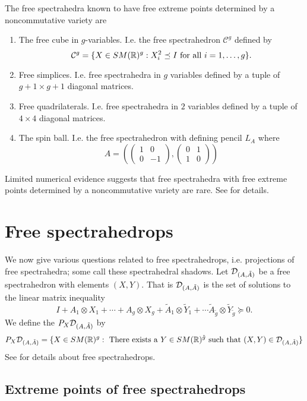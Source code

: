 The free spectrahedra known to have free extreme points determined by a noncommutative variety are
\begin{enumerate}
\item The free cube in $g$-variables. I.e. the free spectrahedron $\mathcal{C}^g$ defined by
\[
\mathcal{C}^g = \{X \in SM(\mathbb{R})^g : X_i^2 \preceq I \ \mathrm{for \ all} \ i = 1,\dots, g\}.
\]
\item Free simplices. I.e. free spectrahedra in $g$ variables defined by a tuple of $g+1 \times g+1$ diagonal matrices.
\item Free quadrilaterals. I.e. free spectrahedra in $2$ variables defined by a tuple of $4 \times 4$ diagonal matrices.
\item The spin ball. I.e. the free spectrahedron with defining pencil $L_A$ where 
\[
A = \left(\begin{pmatrix}
1 & 0 \\ 
0 & -1
\end{pmatrix},
\begin{pmatrix}
0 & 1 \\ 
1 & 0
\end{pmatrix}
\right)
\]
\end{enumerate}

Limited numerical evidence suggests that free spectrahedra with free extreme points determined by a noncommutative variety are rare. See 
\cite{E+} for details.



\section{Free spectrahedrops}

We now give various questions related to free spectrahedrops, i.e. projections of free spectrahedra; some call these spectrahedral shadows. 
Let $\mathcal{D}_{(A,\tilde{A})}$ be a free spectrahedron with elements $(X,Y)$. That is $\mathcal{D}_{(A,\tilde{A})}$ is the set of solutions to the linear 
matrix inequality
\[
I+A_1 \otimes X_1 + \cdots + A_g \otimes X_g + \tilde{A}_1 \otimes \tilde{Y}_1 + \cdots \tilde{A}_{\tilde{g}} \otimes \tilde{Y}_{\tilde{g}} 
\succeq 0. 
\]
We define the  $P_X \mathcal{D}_{(A,\tilde{A})}$ by
\[
P_X \cD_{(A,\tilde{A})} = \{ X \in SM(\R)^g : \mathrm{\ There \ exists\ a \ } Y \in SM(\R)^{\tilde{g}} \ \mathrm{such\ that\ } (X,Y) \in 
\cD_{(A,\tilde{A})} \}
\]
See \cite{HKMjems} for details about free spectrahedrops. 
 
\subsection{Extreme points of free spectrahedrops}

